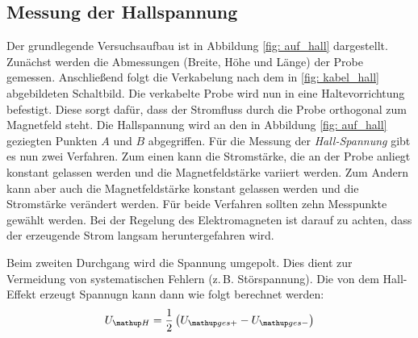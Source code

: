 \subsection{Messung der Hallspannung}
Der grundlegende Versuchsaufbau ist in Abbildung \ref{fig: auf_hall} dargestellt.
Zunächst werden die Abmessungen (Breite, Höhe und Länge) der Probe gemessen.
Anschließend folgt die Verkabelung nach dem in \ref{fig: kabel_hall} abgebildeten Schaltbild.
Die verkabelte Probe wird nun in eine Haltevorrichtung befestigt. Diese sorgt dafür, dass %
der Stromfluss durch die Probe orthogonal zum Magnetfeld steht.
Die Hallspannung wird an den in Abbildung \ref{fig: auf_hall} geziegten Punkten $A$ und $B$ abgegriffen.
Für die Messung der \emph{Hall-Spannung} gibt es nun zwei Verfahren.
Zum einen kann die Stromstärke, die an der Probe anliegt konstant gelassen werden und
die Magnetfeldstärke variiert werden. Zum Andern kann
aber auch die Magnetfeldstärke konstant gelassen werden und die Stromstärke verändert
werden. Für beide Verfahren sollten zehn Messpunkte gewählt werden.
Bei der Regelung des Elektromagneten ist darauf zu achten, dass der
erzeugende Strom langsam heruntergefahren wird.

Beim zweiten Durchgang wird die Spannung umgepolt. %
Dies dient zur Vermeidung von systematischen Fehlern (z.\,B. Störspannung).
Die von dem Hall-Effekt erzeugt Spannugn kann dann wie folgt berechnet werden: %
\begin{equation} %
\label{eq:hall_spann}
U\ua{H}=\frac{1}{2}\left(U\ua{ges+}-U\ua{ges-}\right)
\end{equation}

